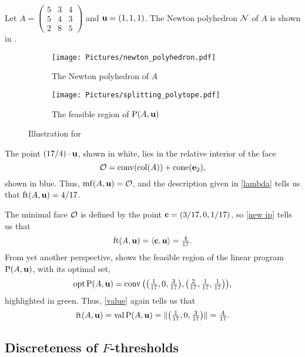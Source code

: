 \documentclass[11pt]{amsart}
\begin{document}
\begin{example}\label{ex: ft}
   Let $A=\left(\begin{smallmatrix}5&3&4\\ 5&4&3\\ 2&8&5\end{smallmatrix}\right)$ and $\mathbf{u} = (1,1,1)$.
   The Newton polyhedron $\mathcal{N}$ of $A$ is shown in .
   \begin{figure}
   \centering
   \begin{subfigure}{.48\textwidth}
      \centering
      \texttt{[image: Pictures/newton\_polyhedron.pdf]}\\[1.4mm]
      \caption{The Newton polyhedron of $A$}
      \label{fig: newton polyhedron}
   \end{subfigure}
   \begin{subfigure}{.48\textwidth}
      \centering
      \texttt{[image: Pictures/splitting\_polytope.pdf]}
      \caption{The feasible region of $\mathrm{P}(A,\mathbf{u})$}
      \label{fig: splitting polytope}
   \end{subfigure}
      \caption{Illustration for }
   \label{fig: newton polyhedron and splitting polytope}
   \end{figure}
   The point $(17/4)\cdot \mathbf{u}$, shown in white, lies in the relative interior of the face
   \[\mathcal{O} = \operatorname{conv}(\operatorname{col}(A)) + \operatorname{cone}(\mathbf{e}_2),\]
   shown in blue.
   Thus, $\operatorname{mf}(A,\mathbf{u}) = \mathcal{O}$, and the description given in \eqref{lambda} tells us that $\operatorname{ft}(A, \mathbf{u}) = 4/17$.

   The minimal face $\mathcal{O}$ is defined by the point $\mathbf{c} = (3/17, 0, 1/17)$, so \eqref{new ip} tells us that
   \[\operatorname{ft}(A, \mathbf{u}) = \langle \mathbf{c}, \mathbf{u} \rangle = \tfrac4{17}.\]
   From yet another perspective,  shows the feasible region of the linear program $\mathrm{P}(A,\mathbf{u})$, with its optimal set,
   \[\operatorname{opt} \mathrm{P}(A,\mathbf{u}) = \operatorname{conv}\big(\big(\tfrac1{17}, 0, \tfrac3{17}\big),\big(\tfrac2{17}, \tfrac1{17}, \tfrac1{17}\big)\big),\]
   highlighted in green.
   Thus, \eqref{value} again tells us that
   \[\operatorname{ft}(A, \mathbf{u}) = \operatorname{val} \mathrm{P}(A,\mathbf{u}) = \| \big(\tfrac1{17}, 0, \tfrac3{17}\big) \| = \tfrac4{17}.\]
\end{example}

\subsection{Discreteness of $F$-thresholds}
\end{document}
